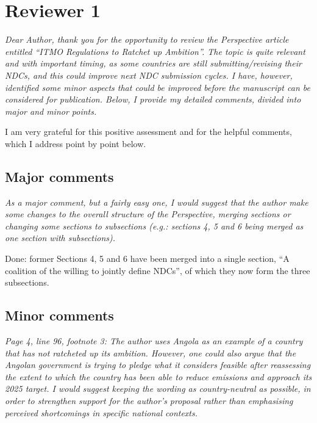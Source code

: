 \documentclass[11pt]{article}
\newenvironment{italic}{\itshape}{\par}
\begin{document}
\section*{Reviewer 1}

\begin{italic}
Dear Author, thank you for the opportunity to review the Perspective article entitled ``ITMO Regulations to Ratchet up Ambition''. The topic is quite relevant and with important timing, as some countries are still submitting/revising their NDCs, and this could improve next NDC submission cycles. I have, however, identified some minor aspects that could be improved before the manuscript can be considered for publication. Below, I provide my detailed comments, divided into major and minor points.
\end{italic}



I am very grateful for this positive assessment and for the helpful comments, which I address point by point below.


\subsection*{Major comments}

\begin{italic}
As a major comment, but a fairly easy one, I would suggest that the author make some changes to the overall structure of the Perspective, merging sections or changing some sections to subsections (e.g.: sections 4, 5 and 6 being merged as one section with subsections).
\end{italic}

Done: former Sections 4, 5 and 6 have been merged into a single section, ``A coalition of the willing to jointly define NDCs'', of which they now form the three subsections.




\subsection*{Minor comments}

\begin{italic}
Page 4, line 96, footnote 3: The author uses Angola as an example of a country that has not ratcheted up its ambition. However, one could also argue that the Angolan government is trying to pledge what it considers feasible after reassessing the extent to which the country has been able to reduce emissions and approach its 2025 target. I would suggest keeping the wording as country-neutral as possible, in order to strengthen support for the author's proposal rather than emphasising perceived shortcomings in specific national contexts.
\end{italic}
\end{document}
